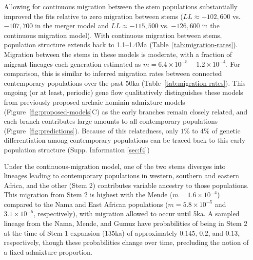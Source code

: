 \documentclass[]{article}
\begin{document}
Allowing for continuous migration between the stem populations substantially
improved the fits relative to zero migration between stems
($LL \approx -102,600$ vs. $-107,700$ in the merger model and
$LL \approx -115,500$ vs. $-126,600$ in the continuous migration model).
With continuous migration between stems, population
structure extends back to 1.1--1.4Ma (Table~\ref{tab:migration-rates}).
Migration between the stems in these models is moderate, with a fraction of
migrant lineages each generation estimated as
$m=6.4\times10^{-5}-1.2\times10^{-4}$. For comparison, this is similar
to inferred migration rates between connected contemporary populations over the
past 50ka (Table~\ref{tab:migration-rates}). This ongoing (or at least,
periodic) gene flow qualitatively distinguishes these models from previously
proposed archaic hominin admixture models (Figure~\ref{fig:proposed-models}C) as
the early branches remain closely related, and each branch contributes large
amounts to all contemporary populations (Figure~\ref{fig:predictions}). 
Because of this relatedness, only $1\%$ to $4\%$ of genetic differentiation
among contemporary populations can be traced back
to this early population structure (Supp. Information \ref{sec:f4})
 
Under the continuous-migration model, one of the two stems diverges into
lineages leading to contemporary populations in western, southern and eastern
Africa, and the other (Stem 2) contributes variable ancestry to those
populations. This migration from Stem 2 is highest with the Mende
($m=1.6\times10^{-4}$) compared to the Nama and East African populations
($m=5.8\times10^{-5}$ and $3.1\times10^{-5}$, respectively), with migration
allowed to occur until 5ka. A
sampled lineage from the Nama, Mende, and Gumuz have probabilities of being in
Stem 2 at the time of Stem 1 expansion (135ka) of approximately $0.145$, $0.2$,
and $0.13$, respectively, though these probabilities change over time,
precluding the notion of a fixed admixture proportion.
\end{document}
